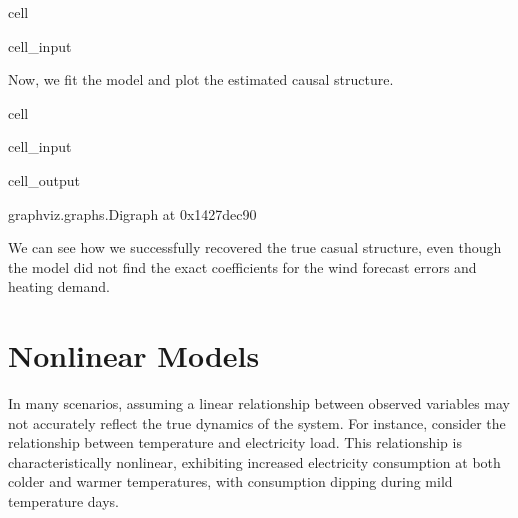 \documentclass[letterpaper,10pt,english]{jupyterBook}
\begin{document}
\begin{sphinxuseclass}{cell}
\begin{sphinxVerbatimInput}
\begin{sphinxuseclass}{cell_input}
\end{sphinxuseclass}\end{sphinxVerbatimInput}

\end{sphinxuseclass}
\sphinxAtStartPar
Now, we fit the  model and plot the estimated causal structure.

\begin{sphinxuseclass}{cell}\begin{sphinxVerbatimInput}

\begin{sphinxuseclass}{cell_input}
\begin{sphinxVerbatim}[commandchars=\\\{\}]
 

  
 
\end{sphinxVerbatim}

\end{sphinxuseclass}\end{sphinxVerbatimInput}
\begin{sphinxVerbatimOutput}

\begin{sphinxuseclass}{cell_output}
\begin{sphinxVerbatim}[commandchars=\\\{\}]
\PYGZlt{}graphviz.graphs.Digraph at 0x1427dec90\PYGZgt{}
\end{sphinxVerbatim}

\end{sphinxuseclass}\end{sphinxVerbatimOutput}

\end{sphinxuseclass}
\sphinxAtStartPar
We can see how we successfully recovered the true casual structure, even though the model did not find the exact coefficients for the wind forecast errors and heating demand.

\sphinxstepscope


\chapter{Nonlinear Models}
\label{\detokenize{notebooks/semiparametric_resit:nonlinear-models}}\label{\detokenize{notebooks/semiparametric_resit::doc}}
\sphinxAtStartPar
In many scenarios, assuming a linear relationship between observed variables may not accurately reflect the true dynamics of the system. For instance, consider the relationship between temperature and electricity load. This relationship is characteristically nonlinear, exhibiting increased electricity consumption at both colder and warmer temperatures, with consumption dipping during mild temperature days.
\end{document}
